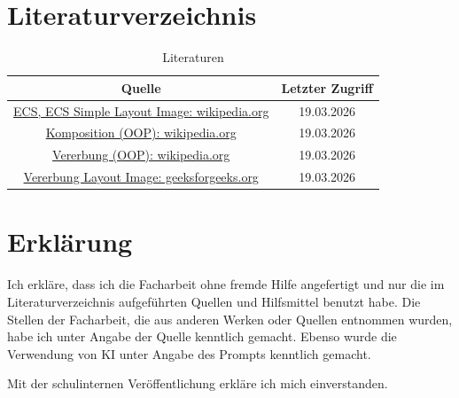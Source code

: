 \documentclass[12pt, a4paper, oneside, ngerman]{scrartcl}
\begin{document}
\newpage
\pagestyle{bibliographystyle}
\section{Literaturverzeichnis}
\begin{table}[h]
    \begin{tabular}{c|c}
        Quelle & Letzter Zugriff \\
        \hline
        \href{https://en.wikipedia.org/wiki/Entity_component_system}{ECS, ECS Simple Layout Image: wikipedia.org}          & 19.03.2026 \\
        \href{https://en.wikipedia.org/wiki/Composition_over_inheritance}{Komposition (OOP): wikipedia.org}                & 19.03.2026 \\
        \href{https://en.wikipedia.org/wiki/Inheritance_(object-oriented_programming)}{Vererbung (OOP): wikipedia.org}     & 19.03.2026 \\
        \href{https://www.geeksforgeeks.org/cpp/what-is-inheritance-1/}{Vererbung Layout Image: geeksforgeeks.org}             & 19.03.2026 \\
    \end{tabular}
    \vspace{0.3cm}
    \caption{Literaturen}
\end{table}

\newpage
\pagestyle{empty}
\section{Erklärung}
Ich erkläre, dass ich die Facharbeit ohne fremde Hilfe angefertigt und nur die im Literaturverzeichnis aufgeführten Quellen und Hilfsmittel benutzt habe.
Die Stellen der Facharbeit, die aus anderen Werken oder Quellen entnommen wurden, habe ich unter Angabe der Quelle kenntlich gemacht.
Ebenso wurde die Verwendung von KI unter Angabe des Prompts kenntlich gemacht.

Mit der schulinternen Veröffentlichung erkläre ich mich einverstanden.
\end{document}
